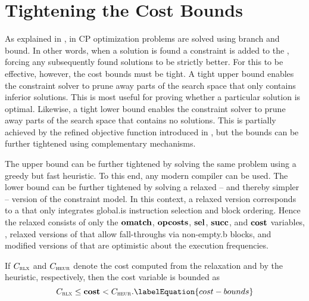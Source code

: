 \section{Tightening the Cost Bounds}

As explained in , in \gls{CP} optimization
problems are solved using \gls{branch and bound}.
%
In other words, when a \gls{solution} is found a \gls{constraint} is added to
the , forcing any subsequently found \glspl{solution}
to be strictly better.
%
For this to be effective, however, the cost bounds must be tight.
%
A tight upper bound enables the \gls{constraint solver} to prune away parts of
the \gls{search space} that only contains inferior \glspl{solution}.
%
This is most useful for proving whether a particular \gls{solution} is optimal.
%
Likewise, a tight lower bound enables the \gls{constraint solver} to prune away
parts of the \gls{search space} that contains no \glspl{solution}.
%
This is partially achieved by the refined \gls{objective function} introduced in
, but the bounds can be further
tightened using complementary mechanisms.

The upper bound can be further tightened by solving the same problem using a
greedy but fast heuristic.
%
To this end, any modern \gls{compiler} can be used.
%
The lower bound can be further tightened by solving a relaxed -- and thereby
simpler -- version of the \gls{constraint model}.
%
In this context, a relaxed version corresponds to a 
that only integrates \gls{global.is} \gls{instruction selection} and \gls{block
  ordering}.
%
Hence the relaxed  consists of only the
$\mVar{omatch}$, $\mVar{opcosts}$, $\mVar{sel}$, $\mVar{succ}$, and
$\mVar{cost}$ variables, , relaxed versions of
 that allow fall-throughs via
non-\gls{empty.b} \glspl{block}, and modified versions of
 that
are optimistic about the execution frequencies.

If $C_{\textsc{\textrm{rlx}}}$ and $C_{\textsc{\textrm{heur}}}$ denote the cost computed from the
relaxation and by the heuristic, respectively, then the \gls{cost variable} is
bounded as
%
\begin{equation}
  \mRelaxedCost \leq \mVar{cost} < \mHeuristicCost.
  \labelEquation{cost-bounds}
\end{equation}



